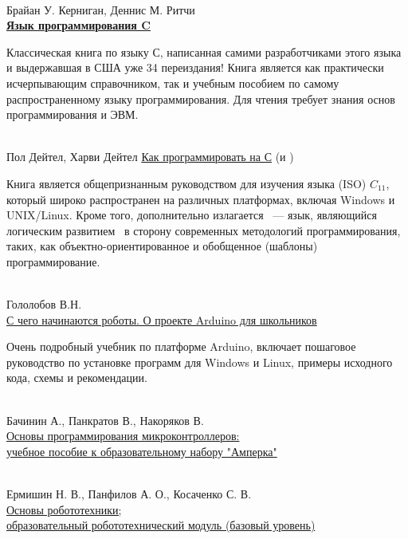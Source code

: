 \begin{thebibliography}{99}

\clearpage

 \\
	Брайан У. Керниган, Деннис М. Ритчи\\
	\href{https://www.ozon.ru/context/detail/id/2480925/}{\textbf{Язык
	программирования C}}
	
Классическая книга по языку С, написанная самими разработчиками этого языка и
выдержавшая в США уже 34 переиздания! Книга является как практически
исчерпывающим справочником, так и учебным пособием по самому распространенному
языку программирования. Для чтения требует знания основ программирования и ЭВМ.

\clearpage

 \\
	Пол Дейтел, Харви Дейтел
	\href{https://www.ozon.ru/context/detail/id/24769512/}{Как программировать на
	С} (и \Cpp)
	
Книга является общепризнанным руководством для изучения языка (ISO) $C_{11}$,
который широко распространен на различных платформах, включая Windows и
UNIX/Linux. Кроме того, дополнительно излагается \Cpp\ --- язык, являющийся
логическим развитием \Ci\ в сторону современных методологий программирования,
таких, как объектно-ориентированное и обобщенное (шаблоны) программирование.

\clearpage

 \\
	Гололобов В.Н.\\
	\href{https://drive.google.com/open?id=1ctDWg_BTIIfJmy11MSw2ktIN0wblXter}{С
	чего начинаются роботы. О проекте Arduino для школьников}
	
Очень подробный учебник по платформе Arduino, включает пошаговое руководство по
установке программ для Windows и Linux, примеры исходного кода, схемы и
рекомендации.

\clearpage

 \\
	Бачинин А., Панкратов В., Накоряков В.\\
	\href{http://examen-technolab.ru/instuctions/tv-0441-m-1.pdf}{Основы программирования
	микроконтроллеров:\\учебное пособие к образовательному набору "Амперка"}
	
\clearpage

 \\
	Ермишин Н. В., Панфилов А. О., Косаченко С. В.\\
	\href{http://examen-technolab.ru/instuctions/tv-0441-m-2.pdf}{Основы
	робототехники;\\образовательный робототехнический модуль (базовый уровень)}


\end{thebibliography}
